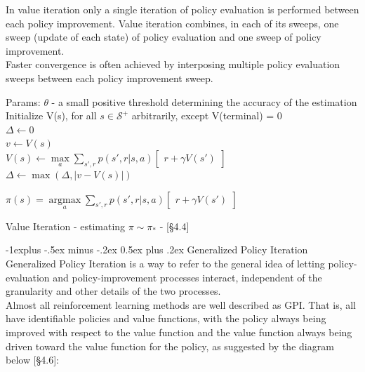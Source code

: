 \documentclass[10pt,landscape]{article}
\makeatletter
\renewcommand{\subsection}{\@startsection{subsection}{2}{0mm}%
                                {-1explus -.5ex minus -.2ex}%
                                {0.5ex plus .2ex}%
                                {\normalfont\normalsize\bfseries}}
\DeclareMathOperator*{\argmax}{argmax}
\makeatother
\begin{document}
\begin{multicols}{3}
In value iteration only a single iteration of policy evaluation is performed between each policy improvement. 
Value iteration combines, in each of its sweeps, one sweep (update of each state) of policy evaluation and one sweep of policy improvement.\\ Faster convergence is often achieved by interposing multiple policy evaluation sweeps between each policy improvement sweep.

\begin{algorithm}[H]
Params: $\theta$ - a small positive threshold determining the accuracy of the estimation \\
Initialize V(s), for all $s \in \mathcal{S}^{+}$ arbitrarily, except V(terminal) = 0\\
 $\Delta \leftarrow 0$ \\
\While{$\Delta \ge \theta$}
{
   {
        $v \leftarrow V(s)$\\
        $V(s) \leftarrow \max\limits_a \sum\limits_{s', r} p(s',r | s, a) \begin{bmatrix}
                r + \gamma V(s')
        \end{bmatrix}$ \\
        $\Delta \leftarrow \max(\Delta, | v - V(s)|)$
        }
}

 $\pi(s) = \argmax\limits_a \sum\limits_{s', r} p(s',r | s, a) \begin{bmatrix}
     r + \gamma V(s')
  \end{bmatrix}$
\caption{Value Iteration - estimating  $\pi \sim \pi_*$ - [§4.4]}
\end{algorithm}



\subsection{Generalized Policy Iteration}
Generalized Policy Iteration is a way to refer to the general idea of letting policy-evaluation and policy-improvement processes interact, independent of the granularity and other details of the two processes. \\
Almost all reinforcement learning methods are well described as GPI. That is, all have identifiable policies and value functions, with the policy always being improved with respect to the value function and the value function always being driven toward the value function for the policy, as suggested by the diagram below [§4.6]:


\end{multicols}
\end{document}
